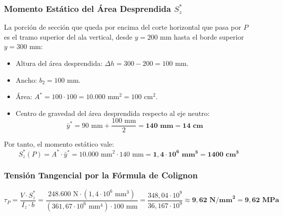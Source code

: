 \subsubsection*{Momento Estático del Área Desprendida $S_z^*$}
La porción de sección que queda por encima del corte horizontal que pasa por $P$ es el tramo superior del ala vertical, desde $y = 200\text{ mm}$ hasta el borde superior $y = 300\text{ mm}$:
\begin{itemize}
    \item Altura del área desprendida: $\Delta h = 300 - 200 = 100\text{ mm}$.
    \item Ancho: $b_2 = 100\text{ mm}$.
    \item Área: $A^* = 100 \cdot 100 = 10.000\text{ mm}^2 = 100\text{ cm}^2$.
    \item Centro de gravedad del área desprendida respecto al eje neutro:
          \[
              \bar{y}^* = 90\text{ mm} + \frac{100\text{ mm}}{2} = \mathbf{140\text{ mm} = 14\text{ cm}}
          \]
\end{itemize}
Por tanto, el momento estático vale:
\begin{equation}
    S_z^*(P) = A^* \cdot \bar{y}^* = 10.000\text{ mm}^2 \cdot 140\text{ mm} = \mathbf{1{,}4 \cdot 10^6\text{ mm}^3 = 1400\text{ cm}^3}
\end{equation}

\subsubsection*{Tensión Tangencial por la Fórmula de Colignon}
\begin{equation}
    \tau_P = \frac{V \cdot S_z^*}{I_z \cdot b} = \frac{248.600\text{ N} \cdot (1{,}4 \cdot 10^6\text{ mm}^3)}{(361{,}67 \cdot 10^6\text{ mm}^4) \cdot 100\text{ mm}} = \frac{348{,}04 \cdot 10^9}{36{,}167 \cdot 10^9} \approx \mathbf{9{,}62\text{ N/mm}^2 = 9{,}62\text{ MPa}}
\end{equation}

